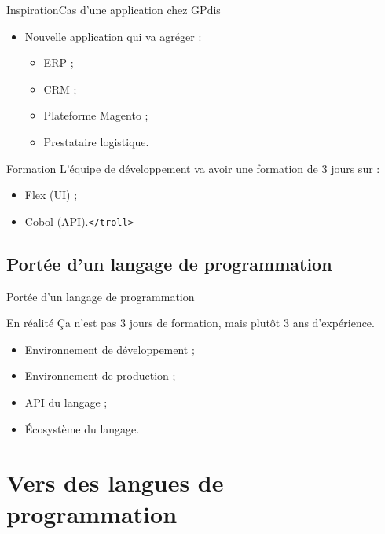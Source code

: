 \documentclass[notes]{beamer}
\begin{document}
\begin{frame}{Inspiration}{Cas d'une application chez GPdis}
    \pause
    \begin{itemize}[<+->]
    \item Nouvelle application qui va agréger :
        \begin{itemize}[<+->]
        \item ERP ;
        \item CRM ;
        \item Plateforme Magento ;
        \item Prestataire logistique.
        \end{itemize}
    \end{itemize}
    \pause
    \begin{alertblock}{Formation}
    L'équipe de développement va avoir une formation de 3 jours sur :
    \pause
    \begin{itemize}[<+->]
    \item Flex (UI) ;
    \item Cobol (API).\verb!</troll>!
    \end{itemize}
    \end{alertblock}
\end{frame}

\subsection{Portée d'un langage de programmation}

\begin{frame}{Portée d'un langage de programmation}
    \pause
    \begin{alertblock}{En réalité}
    Ça n'est pas 3 jours de formation, \pause mais plutôt 3 ans d'expérience.
    \end{alertblock}
    \pause
    \begin{itemize}[<+->]
    \item Environnement de développement ;
    \item Environnement de production ;
    \item API du langage ;
    \item Écosystème du langage.
    \end{itemize}
\end{frame}

\section{Vers des langues de programmation}
\end{document}
